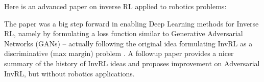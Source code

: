

\renewcommand{\course}{Robot Learning}
\renewcommand{\coursedate}{Summer 2024}
\renewcommand{\exnum}{Weekly Exercise 7}

\renewcommand{\teacher}{Marc Toussaint \& Wolfgang H{\"o}nig}
\renewcommand{\addressTUB}{
  Learning~\&~Intelligent~Systems Lab, Intelligent Multi-Robot Coordination Lab, TU~Berlin\\\small
  Marchstr. 23, 10587 Berlin, Germany
}

\exercises


\providecommand{\ttiny}{\tiny}


\exercisestitle



Here is an advanced paper on inverse RL applied to robotics problems:


The paper was a big step forward in enabling Deep Learning methods for
Inverse RL, namely by formulating a loss function similar to
Generative Adversarial Networks (GANs) -- actually following the
original idea formulating InvRL as a discriminative (max margin)
problem \cite{2000-ng-AlgorithmsInverseReinforcement}. A followup paper \cite{2018-tucker-InverseReinforcementLearning}
provides a nicer summary of the history of InvRL ideas and proposes improvement
on Adversarial InvRL, but without robotics applications.

